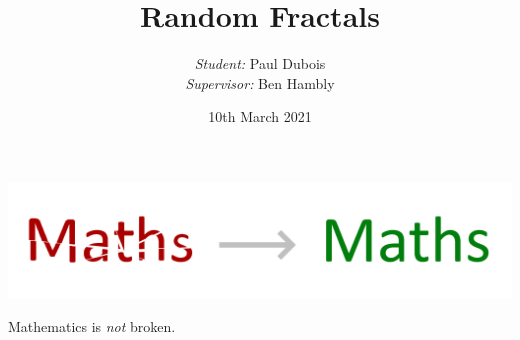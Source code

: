 \documentclass{beamer}
\begin{document}
	
	\title{Random Fractals}
	\author{
		\textit{Student:} Paul Dubois\\
		\textit{Supervisor:} Ben Hambly
	}
	\date{10th March 2021}
	
	\begin{frame}[plain]
		\begin{center}
			\includegraphics[scale=0.12]{front.png}
			\vspace{1cm}
			
			\huge Mathematics is \textit{not} broken.
		\end{center}
	\end{frame}

	\begin{frame}[plain]
		\titlepage
	\end{frame}
	
\end{document}
